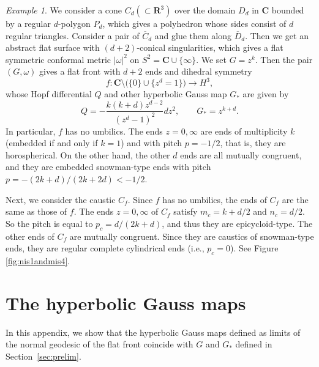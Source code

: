 \documentclass[a4paper]{amsart}
\theoremstyle{plain}
\theoremstyle{remark}
\newtheorem{example}[theorem]{Example}
\numberwithin{equation}{section}
\begin{document}
\begin{example}
\label{exa:n+2-noid}
 We consider a cone $C_d (\subset {\boldsymbol{R}}^3)$ 
 over the domain $D_d$ in ${\boldsymbol{C}}$ bounded by
 a regular $d$-polygon $P_d$, which gives a polyhedron whose
 sides consist of $d$ regular triangles.
 Consider a pair of $\overline C_d$ and 
 glue them along $\overline D_d$. Then we get an
 abstract flat surface with $(d+2)$-conical singularities,
 which gives a flat
 symmetric conformal metric $|\omega|^2$ on 
 $S^2={\boldsymbol{C}}\cup\{\infty\}$.
 We set $G=z^k$. Then the pair $(G,\omega)$ 
 gives a flat front with $d+2$ ends and dihedral symmetry 
 \[
    f \colon {\boldsymbol{C}}\setminus \bigl(\{0\}\cup\{ z^d =1\}\bigr)
       \longrightarrow H^3,
 \]
 whose Hopf differential $Q$ and other 
 hyperbolic Gauss map $G_*$ are given by
 \[
      Q=-\frac{k(k+d)z^{d-2}}{(z^d-1)^2}dz^2,\qquad G_*=z^{k+d}.
 \]
 In particular, $f$ has no umbilics.
 The ends $z=0,\infty$ are ends
 of multiplicity $k$ (embedded if and only if $k=1$) 
 and with pitch $p=-1/2$,
 that is, they are horospherical.
 On the other hand, the other $d$ ends are all
 mutually congruent, and they are embedded snowman-type
 ends with pitch $p=-(2k+d)/(2k+2d)<-1/2$.

 Next, we consider the caustic $C_f$.
 Since $f$ has no umbilics, the ends of
 $C_f$ are the same as those of $f$.
 The ends $z=0,\infty$ of $C_f$ satisfy
 $m_c=k+d/2$ and $n_c=d/2$. So the pitch is
 equal to $p_c=d/(2k+d)$, 
 and thus they are epicycloid-type.  
 The other ends of $C_f$ are mutually congruent.
 Since they are caustics of snowman-type ends,
 they are regular complete
 cylindrical ends (i.e., $p_c=0$).  
 See Figure \ref{fig:nis1andmis4}.  
\end{example}

\appendix
\section{The hyperbolic Gauss maps}
\label{app:boundary}
In this appendix,  we show that the hyperbolic Gauss maps 
defined as limits of the normal geodesic
of the flat front  coincide with $G$ and $G_*$ defined in 
Section~\ref{sec:prelim}.

\smallskip
\end{document}
